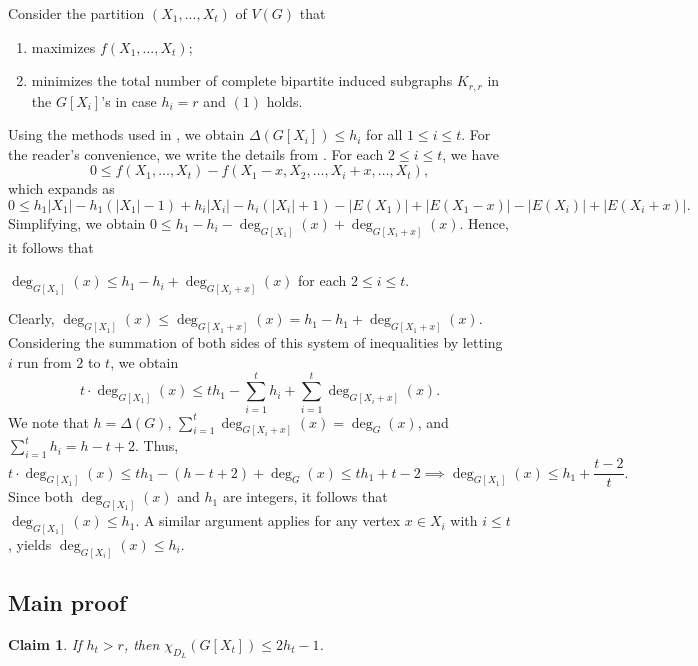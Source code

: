\documentclass[12pt,reqno,a4paper]{amsart}
\theoremstyle{definition}
\newtheorem{claim}[defn]{Claim}
\begin{document}
Consider the partition $(X_{1},...,X_{t})$ of $V(G)$ that
\begin{enumerate}
    \item maximizes $f(X_{1},...,X_{t})$;
    \item minimizes the total number of complete bipartite induced subgraphs $K_{r,r}$ in the $G[X_{i}]$'s in case $h_{i}=r$ and $(1)$ holds.
\end{enumerate}

Using the methods used in \cite{Cat1978a}, we obtain $\Delta(G[X_{i}])\leq h_{i}$ for all $1\leq i\leq t$. 
For the reader's convenience, we write the details from \cite{Cat1978a}.
For each $2\leq i\leq t$, we have
\[
0 \leq f(X_1, \ldots, X_t) - f(X_1 - x, X_2, \ldots, X_i + x, \ldots, X_t),
\]
which expands as
\[
0\leq h_1|X_1| - h_1(|X_1| - 1) + h_i|X_i| - h_i(|X_i| + 1) - |E(X_1)| + |E(X_1 - x)| - |E(X_i)| + |E(X_i + x)|.
\]
Simplifying, we obtain 
$0\leq h_1 - h_i - \deg_{G[X_1]}(x) + \deg_{G[X_i + x]}(x).$
Hence, it follows that
\begin{center}
$\deg_{G[X_1]}(x) \leq h_1 - h_i + \deg_{G[X_i + x]}(x)$ for each $2\leq i\leq t$.     
\end{center}

Clearly, $\deg_{G[X_{1}]}(x)\leq \deg_{G[X_{1}+x]}(x)=h_{1}-h_{1}+\deg_{G[X_{1}+x]}(x)$.
Considering the summation of both sides of this system of inequalities by letting $i$ run from $2$ to $t$, we obtain
\[
t \cdot \deg_{G[X_1]}(x) \leq t h_1 - \sum_{i=1}^{t} h_i + \sum_{i=1}^{t} \deg_{G[X_i + x]}(x).
\]
We note that $h=\Delta(G)$,
$\sum_{i=1}^{t} \deg_{G[X_i + x]}(x) = \deg_G(x)$,
and \( \sum_{i=1}^{t} h_i = h - t + 2 \). Thus, 
\[
t \cdot \deg_{G[X_1]}(x) \leq t h_1 - (h - t + 2) + \deg_G(x) \leq t h_1 + t - 2 \implies 
\deg_{G[X_1]}(x) \leq h_1 + \frac{t - 2}{t}.
\]
Since both \( \deg_{G[X_1]}(x) \) and \( h_1 \) are integers, it follows that
$
\deg_{G[X_1]}(x) \leq h_1.
$
A similar argument applies for any vertex \( x \in X_i \) with \( i \leq t \), yields
$
\deg_{G[X_i]}(x) \leq h_i.
$

\subsection{Main proof}

\begin{claim}\label{claim 3.1}
{\em If $h_{t}>r$, then $\chi_{D_{L}}(G[X_{t}])\leq 2h_{t}-1$.} 
\end{claim}
\end{document}
